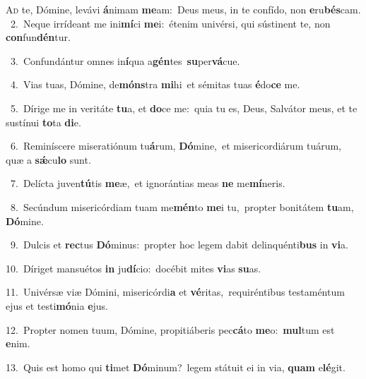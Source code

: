 \lettrine{\initial\textcolor{\initialcolor}{A}}{d} te, Dómine, levávi \textbf{á}\-nimam \textbf{me}\-am:~\star Deus meus, in te confído, non \textbf{e}\-ru\-\textbf{bés}\-cam.\\
{\numbfont\textcolor{\numbcolor}{~2.}}~Neque irrídeant me ini\-\textbf{mí}\-ci \textbf{me}\-i:~\star étenim univérsi, qui sústinent te, non \textbf{con}\-fun\-\textbf{dén}\-tur.\par
{\numbfont\textcolor{\numbcolor}{~3.}}~Confundántur omnes in\-\textbf{í}\-qua a\-\textbf{gén}\-tes~\star \textbf{su}\-per\-\textbf{vá}\-cue.\par
{\numbfont\textcolor{\numbcolor}{~4.}}~Vias tuas, Dómine, de\-\textbf{móns}\-tra \textbf{mi}\-hi~\star et sémitas tuas \textbf{é}\-do\textbf{ce} me.\par
{\numbfont\textcolor{\numbcolor}{~5.}}~Dírige me in veritáte \textbf{tu}\-a, et \textbf{do}\-ce me:~\star quia tu es, Deus, Salvátor meus, et te sustínui \textbf{to}\-ta \textbf{di}\-e.\par
{\numbfont\textcolor{\numbcolor}{~6.}}~Reminíscere miseratiónum tu\-\textbf{á}\-rum, \textbf{Dó}\-mine,~\star et misericordiárum tuárum, quæ a \textbf{sǽ}\-cu\textbf{lo} sunt.\par
{\numbfont\textcolor{\numbcolor}{~7.}}~Delícta juven\-\textbf{tú}\-tis \textbf{me}\-æ,~\star et ignorántias meas \textbf{ne} me\-\textbf{mí}\-neris.\par
{\numbfont\textcolor{\numbcolor}{~8.}}~Secúndum misericórdiam tuam me\-\textbf{mén}\-to \textbf{me}\-i tu,~\star propter bonitátem \textbf{tu}\-am, \textbf{Dó}\-mine.\par
{\numbfont\textcolor{\numbcolor}{~9.}}~Dulcis et \textbf{rec}\-tus \textbf{Dó}\-minus:~\star propter hoc legem dabit delinquénti\textbf{bus} in \textbf{vi}\-a.\par
{\numbfont\textcolor{\numbcolor}{10.}}~Díriget mansuétos \textbf{in} ju\-\textbf{dí}\-cio:~\star docébit mites \textbf{vi}\-as \textbf{su}\-as.\par
{\numbfont\textcolor{\numbcolor}{11.}}~Univérsæ viæ Dómini, misericórdi\textbf{a} et \textbf{vé}\-ritas,~\star requiréntibus testaméntum ejus et testi\-\textbf{mó}\-nia \textbf{e}\-jus.\par
{\numbfont\textcolor{\numbcolor}{12.}}~Propter nomen tuum, Dómine, propitiáberis pec\-\textbf{cá}\-to \textbf{me}\-o:~\star \textbf{mul}\-tum est \textbf{e}\-nim.\par
{\numbfont\textcolor{\numbcolor}{13.}}~Quis est homo qui \textbf{ti}\-met \textbf{Dó}\-minum?~\star legem státuit ei in via, \textbf{quam} e\-\textbf{lé}\-git.\par
